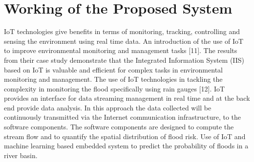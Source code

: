 \documentclass[a4paper,12pt]{report}
\begin{document}
\section{Working of the Proposed System}
IoT technologies give benefits in terms of monitoring, tracking, controlling and sensing the environment using real time data. An introduction of the use of IoT to improve environmental monitoring and management tasks [11]. The results from their case study demonstrate that the Integrated Information System (IIS) based on IoT is valuable and efficient for complex tasks in environmental monitoring and management. The use of IoT technologies in tackling the complexity in monitoring the flood specifically using rain gauges [12]. IoT provides an interface for data streaming management in real time and at the back end provide data analysis. In this approach the data collected will be continuously transmitted via the Internet communication infrastructure, to the software components. The software components are designed to compute the stream flow and to quantify the spatial distribution of flood risk. Use of IoT and machine learning based embedded system to predict the probability of floods in a river basin.\\
\end{document}
